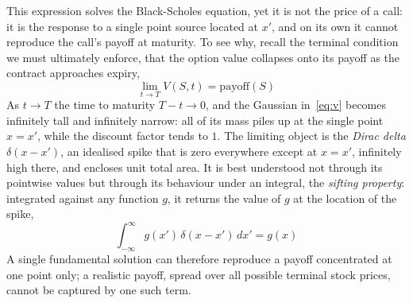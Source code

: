 \documentclass[a4paper,12pt]{article}
\numberwithin{equation}{section}
\begin{document}
This expression solves the Black-Scholes equation, yet it is not the price of a
call: it is the response to a single point source located at $x'$, and on its
own it cannot reproduce the call's payoff at maturity. To see why, recall the
terminal condition we must ultimately enforce, that the option value collapses
onto its payoff as the contract approaches expiry,
\begin{equation}\label{eq:termcond}
  \lim_{t \to T} V(S,t) = \mathrm{payoff}(S)
\end{equation}
As $t \to T$ the time to maturity $T-t \to 0$, and the Gaussian in~\eqref{eq:v}
becomes infinitely tall and infinitely narrow: all of its mass piles up at the
single point $x = x'$, while the discount factor tends to $1$. The limiting
object is the \emph{Dirac delta} $\delta(x - x')$, an idealised spike that is
zero everywhere except at $x = x'$, infinitely high there, and encloses unit
total area. It is best understood not through its pointwise values but through
its behaviour under an integral, the \emph{sifting property}: integrated against
any function $g$, it returns the value of $g$ at the location of the spike,
\begin{equation}\label{eq:sift}
  \int_{-\infty}^{\infty} g(x')\,\delta(x - x')\,dx' = g(x)
\end{equation}
A single fundamental solution can therefore reproduce a payoff concentrated at
one point only; a realistic payoff, spread over all possible terminal stock
prices, cannot be captured by one such term.
\end{document}
